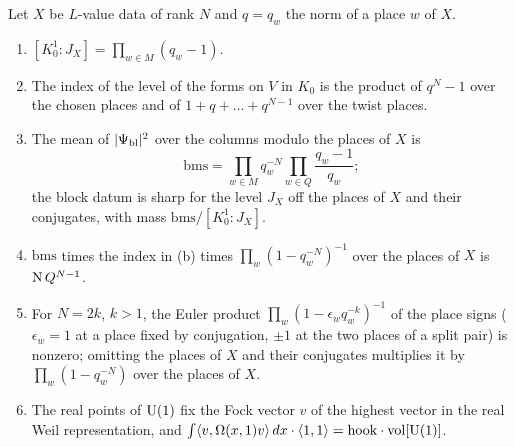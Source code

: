 \begin{lemma}\label{lem:character-indices}
Let $X$ be $L$-value data of rank $N$ and $q=q_w$ the norm of a place $w$ of $X$.
\begin{enumerate}[label=\textup{(\alph*)}]
\item $[K_0^1:J_X]=\prod_{w\in M}(q_w-1)$.
\item The index of the level of the forms on $V$ in $K_0$ is the product of $q^N-1$ over the chosen places and of $1+q+\dots+q^{N-1}$ over the twist places.
\item The mean of $\lvert \Psi_{\rm bl}\rvert^2$ over the columns modulo the places of $X$ is
\[
  \mathrm{bms}=\prod_{w\in M}q_w^{-N}\prod_{w\in Q}\frac{q_w-1}{q_w};
\]
the block datum is sharp for the level $J_X$ off the places of $X$ and their
conjugates, with mass $\mathrm{bms}/[K_0^1:J_X]$.
\item $\mathrm{bms}$ times the index in (b) times $\prod_w(1-q_w^{-N})^{-1}$ over the places of $X$ is $\operatorname{N} Q^{N-1}$.
\item For $N=2k$, $k>1$, the Euler product $\prod_w(1-\epsilon_wq_w^{-k})^{-1}$ of the place signs ($\epsilon_w=1$ at a place fixed by conjugation, $\pm1$ at the two places of a split pair) is nonzero; omitting the places of $X$ and
their conjugates multiplies it by $\prod_w(1-q_w^{-N})$ over the places of $X$.
\item The real points of $\operatorname{U}(1)$ fix the Fock vector $v$ of the highest vector in the real Weil representation, and $\int\langle v,\Omega(x,1)v\rangle\,dx\cdot\langle1,1\rangle=\mathrm{hook}\cdot\operatorname{vol}[\operatorname{U}(1)]$.
\end{enumerate}
\end{lemma}

